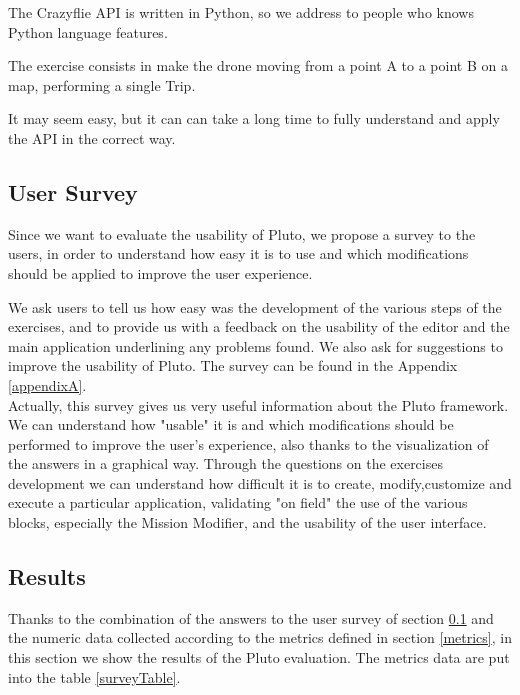 The Crazyflie API is written in Python, so we address to people who knows Python language features.

The exercise consists in make the drone moving from a point A to a point B on a map, performing a single Trip.

It may seem easy, but it can can take a long time to fully understand and apply the API in the correct way.


\subsection{User Survey}\label{survey}

Since we want to evaluate the usability of Pluto, we propose a survey to the users, in order to understand how easy it is to use and which modifications should be applied to improve the user experience.

We ask users to tell us how easy was the development of the various steps of the exercises, and to provide us with a feedback on the usability of the editor and the main application underlining any problems found.
We also ask for suggestions to improve the usability of Pluto.
The survey can be found in the Appendix \ref{appendixA}.
\\


Actually, this survey gives us very useful information about the Pluto framework. We can understand how "usable" it is and which modifications should be performed to improve the user's experience, also thanks to the visualization of the answers in a graphical way.
Through the questions on the exercises development we can understand how difficult it is to create, modify,customize and execute a particular application, validating "on field" the use of the various blocks, especially the Mission Modifier, and the usability of the user interface.

\subsection{Results}\label{surveyResult}

Thanks to the combination of the answers to the user survey of section \ref{survey} and the numeric data collected according to the metrics defined in section \ref{metrics}, in this section we show the results of the Pluto evaluation.
The metrics data are put into the table \ref{surveyTable}.
\\

